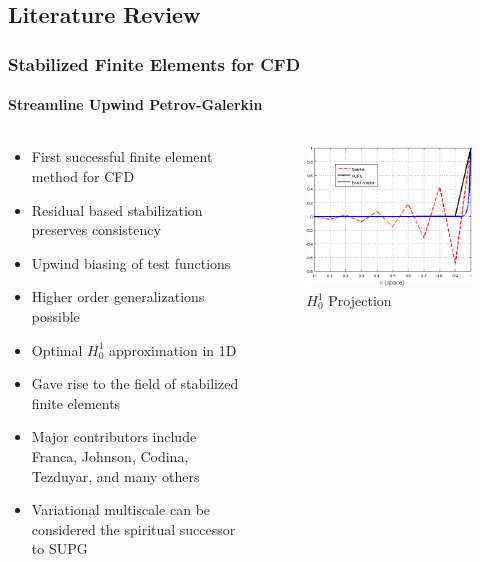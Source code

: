 \documentclass[18pt,xcolor=table]{beamer}
\begin{document}
\subsection{Literature Review}
\begin{frame}[t]
\frametitle{Stabilized Finite Elements for CFD}
\framesubtitle{Streamline Upwind Petrov-Galerkin}
\begin{columns}[c]
\begin{column}{.65\textwidth}
\begin{itemize}
  \item First successful finite element method for CFD\footnotemark
  \item Residual based stabilization preserves consistency
  \item Upwind biasing of test functions
  \item Higher order generalizations possible
  \item Optimal $H_0^1$ approximation in 1D
  \item Gave rise to the field of stabilized finite elements
  \item Major contributors include Franca, Johnson, Codina, Tezduyar, and many others
  \item Variational multiscale can be considered the spiritual successor to SUPG\footnotemark
\end{itemize}
\end{column}
\begin{column}{.35\textwidth}
\begin{figure}[t]
\centering
\includegraphics[width=1.0\textwidth]{Motivation/SUPG.png}
\\\small{$H_0^1$ Projection}\\
\end{figure}
\end{column}
\end{columns}
\end{frame}
\end{document}
